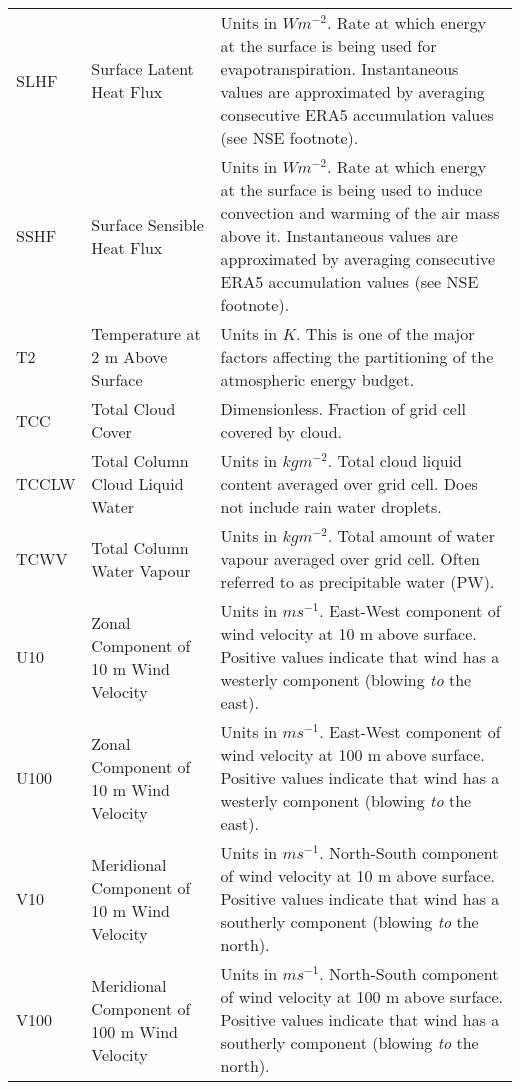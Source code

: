 \begin{landscape}
\begin{longtable}{P{2cm}P{3cm}P{15cm}}
		SLHF & Surface Latent Heat Flux & Units in $W m^{-2}$. Rate at which energy at the surface is being used for evapotranspiration. Instantaneous values are approximated by averaging consecutive ERA5 accumulation values (see NSE footnote). \\
		SSHF & Surface Sensible Heat Flux & Units in $W m^{-2}$. Rate at which energy at the surface is being used to induce convection and warming of the air mass above it. Instantaneous values are approximated by averaging consecutive ERA5 accumulation values (see NSE footnote). \\
		T2 & Temperature at 2 m Above Surface & Units in $K$. This is one of the major factors affecting the partitioning of the atmospheric energy budget. \\
		TCC & Total Cloud Cover & Dimensionless. Fraction of grid cell covered by cloud. \\
		TCCLW & Total Column Cloud Liquid Water & Units in $kg m^{-2}$. Total cloud liquid content averaged over grid cell. Does not include rain water droplets. \\
		TCWV & Total Column Water Vapour & Units in $kg m^{-2}$. Total amount of water vapour averaged over grid cell. Often referred to as precipitable water (PW). \\
		U10 & Zonal Component of 10 m Wind Velocity & Units in $m s^{-1}$. East-West component of wind velocity at 10 m above surface. Positive values indicate that wind has a westerly component (blowing \textit{to} the east). \\
		U100 & Zonal Component of 10 m Wind Velocity & Units in $m s^{-1}$. East-West component of wind velocity at 100 m above surface. Positive values indicate that wind has a westerly component (blowing \textit{to} the east). \\
		V10 & Meridional Component of 10 m Wind Velocity & Units in $m s^{-1}$. North-South component of wind velocity at 10 m above surface. Positive values indicate that wind has a southerly component (blowing \textit{to} the north). \\
		V100 & Meridional Component of 100 m Wind Velocity & Units in $m s^{-1}$. North-South component of wind velocity at 100 m above surface. Positive values indicate that wind has a southerly component (blowing \textit{to} the north). \\

\end{longtable}
\end{landscape}
